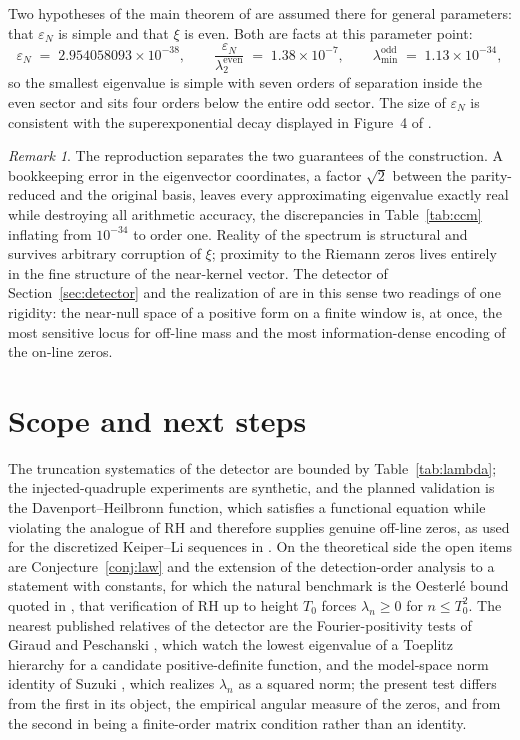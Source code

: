 \documentclass[11pt,oneside]{article}
\theoremstyle{remark}
\newtheorem{remark}[proposition]{Remark}
\begin{document}
Two hypotheses of the main theorem of \cite{CCM} are assumed there for general
parameters: that $\varepsilon_N$ is simple and that $\xi$ is even. Both are
facts at this parameter point:
\[
\varepsilon_N \;=\; 2.954058093\times 10^{-38},
\qquad
\frac{\varepsilon_N}{\lambda_2^{\mathrm{even}}} \;=\; 1.38\times10^{-7},
\qquad
\lambda_{\min}^{\mathrm{odd}} \;=\; 1.13\times10^{-34},
\]
so the smallest eigenvalue is simple with seven orders of separation inside the
even sector and sits four orders below the entire odd sector. The size of
$\varepsilon_N$ is consistent with the superexponential decay displayed in
Figure~4 of \cite{CCM}.

\begin{samepage}
\begin{remark}\label{rem:split}
The reproduction separates the two guarantees of the construction. A
bookkeeping error in the eigenvector coordinates, a factor $\sqrt2$ between the
parity-reduced and the original basis, leaves every approximating eigenvalue
exactly real while destroying all arithmetic accuracy, the discrepancies in
Table~\ref{tab:ccm} inflating from $10^{-34}$ to order one. Reality of the
spectrum is structural and survives arbitrary corruption of $\xi$; proximity to
the Riemann zeros lives entirely in the fine structure of the near-kernel
vector. The detector of Section~\ref{sec:detector} and the realization of
\cite{CCM} are in this sense two readings of one rigidity: the near-null space
of a positive form on a finite window is, at once, the most sensitive locus for
off-line mass and the most information-dense encoding of the on-line zeros.
\end{remark}
\end{samepage}

\section{Scope and next steps}

The truncation systematics of the detector are bounded by
Table~\ref{tab:lambda}; the injected-quadruple experiments are synthetic, and
the planned validation is the Davenport--Heilbronn function, which satisfies a
functional equation while violating the analogue of RH and therefore supplies
genuine off-line zeros, as used for the discretized Keiper--Li sequences in
\cite{VorosDisc}. On the theoretical side the open items are
Conjecture~\ref{conj:law} and the extension of the detection-order analysis to
a statement with constants, for which the natural benchmark is the Oesterl\'e
bound quoted in \cite{VorosBook}, that verification of RH up to height $T_0$
forces $\lambda_n \ge 0$ for $n \le T_0^2$. The nearest published relatives of
the detector are the Fourier-positivity tests of Giraud and Peschanski
\cite{GP}, which watch the lowest eigenvalue of a Toeplitz hierarchy for a
candidate positive-definite function, and the model-space norm identity of
Suzuki \cite{Suzuki}, which realizes $\lambda_n$ as a squared norm; the present
test differs from the first in its object, the empirical angular measure of the
zeros, and from the second in being a finite-order matrix condition rather than
an identity.
\end{document}
